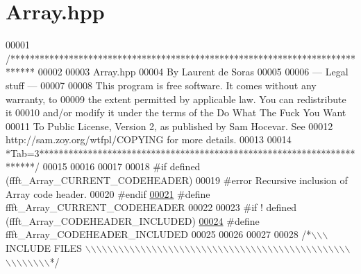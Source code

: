 \hypertarget{a00084_source}{\section{Array.\+hpp}
\label{a00084_source}
}

\begin{DoxyCode}
00001 \textcolor{comment}{/*****************************************************************************}
00002 \textcolor{comment}{}
00003 \textcolor{comment}{        Array.hpp}
00004 \textcolor{comment}{        By Laurent de Soras}
00005 \textcolor{comment}{}
00006 \textcolor{comment}{--- Legal stuff ---}
00007 \textcolor{comment}{}
00008 \textcolor{comment}{This program is free software. It comes without any warranty, to}
00009 \textcolor{comment}{the extent permitted by applicable law. You can redistribute it}
00010 \textcolor{comment}{and/or modify it under the terms of the Do What The Fuck You Want}
00011 \textcolor{comment}{To Public License, Version 2, as published by Sam Hocevar. See}
00012 \textcolor{comment}{http://sam.zoy.org/wtfpl/COPYING for more details.}
00013 \textcolor{comment}{}
00014 \textcolor{comment}{*Tab=3***********************************************************************/}
00015 
00016 
00017 
00018 \textcolor{preprocessor}{#if defined (ffft\_Array\_CURRENT\_CODEHEADER)}
00019 \textcolor{preprocessor}{    #error Recursive inclusion of Array code header.}
00020 \textcolor{preprocessor}{#endif}
\hypertarget{a00084_source_l00021}{}\hyperlink{a00084_a478c0a3d4e07d03940b1ced717db82e9}{00021} \textcolor{preprocessor}{#define ffft\_Array\_CURRENT\_CODEHEADER}
00022 
00023 \textcolor{preprocessor}{#if ! defined (ffft\_Array\_CODEHEADER\_INCLUDED)}
\hypertarget{a00084_source_l00024}{}\hyperlink{a00084_a9c7eea905ae130cc9a5ee2a20ded5c21}{00024} \textcolor{preprocessor}{#define ffft\_Array\_CODEHEADER\_INCLUDED}
00025 
00026 
00027 
00028 \textcolor{comment}{/*\(\backslash\)\(\backslash\)\(\backslash\) INCLUDE FILES \(\backslash\)\(\backslash\)\(\backslash\)\(\backslash\)\(\backslash\)\(\backslash\)\(\backslash\)\(\backslash\)\(\backslash\)\(\backslash\)\(\backslash\)\(\backslash\)\(\backslash\)\(\backslash\)\(\backslash\)\(\backslash\)\(\backslash\)\(\backslash\)\(\backslash\)\(\backslash\)\(\backslash\)\(\backslash\)\(\backslash\)\(\backslash\)\(\backslash\)\(\backslash\)\(\backslash\)\(\backslash\)\(\backslash\)\(\backslash\)\(\backslash\)\(\backslash\)\(\backslash\)\(\backslash\)\(\backslash\)\(\backslash\)\(\backslash\)\(\backslash\)\(\backslash\)\(\backslash\)\(\backslash\)\(\backslash\)\(\backslash\)\(\backslash\)\(\backslash\)\(\backslash\)\(\backslash\)\(\backslash\)\(\backslash\)\(\backslash\)\(\backslash\)\(\backslash\)\(\backslash\)\(\backslash\)\(\backslash\)\(\backslash\)*/}

\end{DoxyCode}
